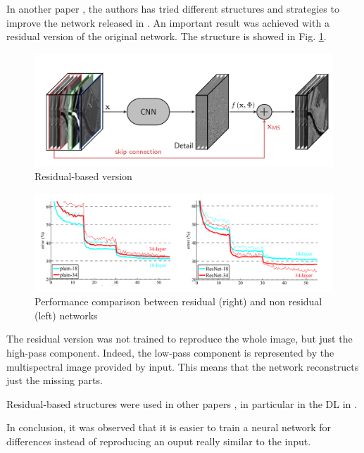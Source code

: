\documentclass[12pt]{report}
\begin{document}
In another paper \cite{residualpnn}, the authors has tried different structures and strategies to improve the network released in \cite{pnn}.
An important result was achieved with a residual version of the original network.
The structure is showed in Fig. \ref{fig:residual-architecture}.

\begin{figure}[t]
    \centering
    \includegraphics[scale=.35]{residualpnn-architecture.png}
    \caption{Residual-based version \cite{residualpnn}}
    \label{fig:residual-architecture}
\end{figure}

\begin{figure}[t]
    \centering
    \includegraphics[scale=.35]{residual_comparison.png}
    \caption{Performance comparison between residual (right) and non residual (left) networks \cite{residual4}}
    \label{fig:residual-comparison}
\end{figure}

The residual version was not trained to reproduce the whole image,
but just the high-pass component. Indeed, the low-pass component is represented by the 
multispectral image provided by input. This means that the network reconstructs just the missing parts.

Residual-based structures were used in other papers \cite{residual1, residual2}, in particular in the DL in \cite{residual3, residual4}.

In conclusion, it was observed that it is easier to train a neural network for differences
instead of reproducing an ouput really similar to the input. 
\end{document}
